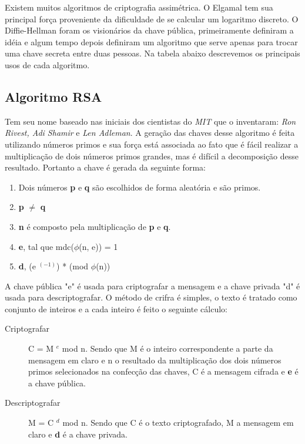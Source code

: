 %
Existem muitos algoritmos de criptografia assimétrica. O Elgamal tem sua principal força proveniente da dificuldade de se calcular um logaritmo discreto.  O Diffie-Hellman foram os visionários da chave pública, primeiramente definiram a idéia e algum tempo depois definiram um algoritmo que serve apenas para trocar uma chave secreta entre duas pessoas.  Na tabela abaixo descrevemos os principais usos de cada algoritmo. 

\subsection{Algoritmo RSA}
\label{algorithm-rsa}

Tem seu nome baseado nas iniciais dos cientistas do \textit{MIT} que o inventaram: \textit{Ron Rivest, Adi Shamir} e \textit{Len Adleman}. A geração das chaves desse algoritmo é feita utilizando números primos e sua força está associada ao fato que é fácil realizar a multiplicação de dois números primos grandes, mas é difícil a decomposição desse resultado. Portanto a chave é gerada da seguinte forma:

\begin{enumerate}
\item Dois números \textbf{p} e \textbf{q} são escolhidos de forma aleatória e são primos.
\item \textbf{p} $\neq$ \textbf{q}
\item \textbf{n} é composto pela multiplicação de \textbf{p} e \textbf{q}.
\item \textbf{e}, tal que mdc($\phi$(n, e)) = 1
\item \textbf{d}, (e $^ {(-1)}$) * (mod $\phi$(n)) 
\end{enumerate}

%
A chave pública "e" é usada para criptografar a mensagem e a chave privada "d" é usada para descriptografar. O método de crifra é simples, o texto é tratado como conjunto de inteiros e a cada inteiro é feito o seguinte cálculo:

\begin{description}
\item [Criptografar]
C = M $^ e$ mod n. Sendo que M é o inteiro correspondente a parte da mensagem em claro e n o resultado da multiplicação dos dois números primos selecionados na confecção  das chaves, C é a mensagem cifrada e \textbf{e} é a chave pública. 
\item [Descriptografar]
M = C $^ d$ mod n. Sendo que C é o texto criptografado, M a mensagem em claro e \textbf{d} é a chave privada.
\end{description}


